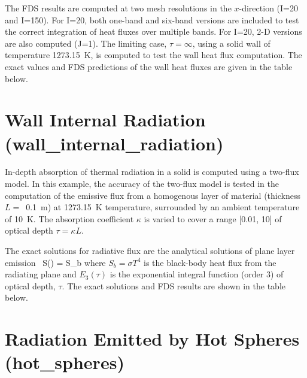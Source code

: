 \documentclass[11pt]{book}
\begin{document}
The FDS results are computed at two mesh resolutions in the $x$-direction (I=20 and I=150). For I=20, both one-band and six-band versions are
included to test the correct integration of heat fluxes over multiple bands. For I=20, 2-D versions are also computed (J=1). The limiting case, $\tau=\infty$,
using a solid wall of temperature 1273.15~K, is computed to test the wall heat flux computation. The exact values and FDS predictions of
the wall heat fluxes are given in the table below.




\clearpage
\section{Wall Internal Radiation (\texorpdfstring{{\bf wall\_internal\_radiation}}{wall\_internal\_radiation}) }
\label{wall_internal_radiation}


In-depth absorption of thermal radiation in a solid is computed using a two-flux model.  In this example, the accuracy of the two-flux model
is tested in the computation of the emissive flux from a homogenous layer of material (thickness $L=$~0.1~m) at 1273.15~K temperature,
surrounded by an ambient temperature of 10~K. The absorption coefficient $\kappa$ is varied to cover a range [0.01, 10] of optical depth
$\tau = \kappa L$.

The exact solutions for radiative flux are the analytical solutions of plane layer emission~\cite{Zeldovich:1}
\be S(\tau) = S_b \ee
where $S_b = \sigma T^4$ is the black-body heat flux from the radiating plane and $E_3(\tau)$ is the exponential
integral function (order 3) of optical depth, $\tau$. The exact solutions and FDS results are shown in the table below.





\clearpage

\section{Radiation Emitted by Hot Spheres (\texorpdfstring{{\bf hot\_spheres}}{hot\_spheres}) }
\label{hot_spheres}
\end{document}
